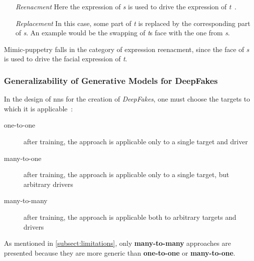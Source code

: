 \begin{enumerate}
    \item[\textit{Reenacment}] Here the expression of \textit{s} is used to drive
    the expression of \textit{t}~\cite{mirsky_creation_2020}.
    \item[\textit{Replacement}] In this case, some part of \textit{t} is replaced
    by the corresponding part of \textit{s}. An example would be the swapping of
    \textit{t}s face with the one from \textit{s}.
\end{enumerate}

Mimic-puppetry falls in the category of expression reenacment, since the face of
\textit{s} is used to drive the facial expression of \textit{t}.


\subsubsection{Generalizability of Generative Models for DeepFakes}\label{subsubsect:generalizability-deepfakes}
In the design of \glspl{nn} for the creation of \textit{DeepFakes}, one must choose the
targets to which it is applicable~\cite[cf.][]{Mirsky.2020}:
\begin{description}
    \item[one-to-one] after training, the approach is applicable only to a
    single target and driver
    \item[many-to-one] after training, the approach is applicable only to a
    single target, but arbitrary drivers
    \item[many-to-many] after training, the approach is applicable both to
    arbitrary targets and drivers
\end{description}
As mentioned in \cref{subsect:limitations}, only \textbf{many-to-many} approaches
are presented because they are more generic than \textbf{one-to-one} or
\textbf{many-to-one}.

